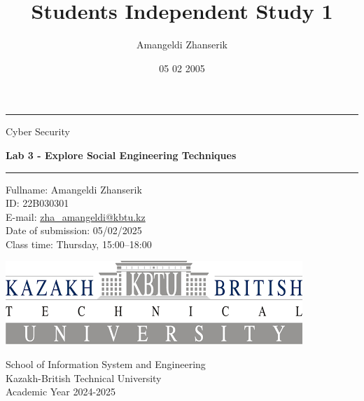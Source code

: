 \documentclass{article}
\title{Students Independent Study 1}
\author{Amangeldi Zhanserik}
\date{05 02 2005}
\begin{document}
\begin{titlepage}
    \centering

    \vspace*{1cm}

    \rule{\textwidth}{1pt}

    \vspace{2\baselineskip}

    {\huge  Cyber Security } \\

    \vspace{1\baselineskip}

    {\huge \textbf{ Lab 3 - Explore Social Engineering Techniques}}

    \vspace{2\baselineskip}

    \rule{\textwidth}{1pt}

    \vspace{1cm}

    \large

    \begin{flushleft}
        \begin{minipage}{.8\textwidth}
            \raggedright
            Fullname: Amangeldi Zhanserik \\
            ID: 22B030301 \\
            E-mail: {\normalsize \url{zha_amangeldi@kbtu.kz}} \\
            Date of submission: 05/02/2025 \\
            Class time: Thursday, 15:00--18:00 \\
        \end{minipage}%
    \end{flushleft}

    \vspace{2cm}

    \includegraphics[width=.7\textwidth]{logo-kbtu.png}

    \vfill

    School of Information System and Engineering \\
    Kazakh-British Technical University \\
    Academic Year 2024-2025 \\
\end{titlepage}
\end{document}
